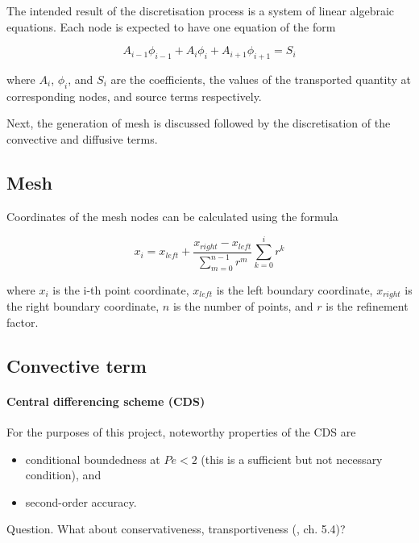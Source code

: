 \documentclass[12pt]{article}
\begin{document}
The intended result of the discretisation process is a system of linear algebraic equations. Each node is expected to have one equation of the form

\begin{equation}
    A_{i-1} \phi_{i-1} + A_{i} \phi_{i} + A_{i+1} \phi_{i+1} = S_{i}
\end{equation}

\noindent where $A_{i}$, $\phi_{i}$, and $S_{i}$ are the coefficients, the values of the transported quantity at corresponding nodes, and source terms respectively.

Next, the generation of mesh is discussed followed by the discretisation of the convective and diffusive terms.


\subsection{Mesh}
\label{sec:mesh}

Coordinates of the mesh nodes can be calculated using the formula

\begin{equation}
    x_i = x_{left} + \frac{x_{right} - x_{left}}{\sum_{m = 0}^{n - 1} r^m} \sum_{k = 0}^{i} r^k
\end{equation}

\noindent where $x_i$ is the i-th point coordinate, $x_{left}$ is the left boundary coordinate, $x_{right}$ is the right boundary coordinate, $n$ is the number of points, and $r$ is the refinement factor.


\subsection{Convective term}
\label{sec:convection}


\paragraph{Central differencing scheme (CDS)}

For the purposes of this project, noteworthy properties of the CDS are

\begin{itemize}
    \item conditional boundedness at $Pe < 2$ (this is a sufficient but not necessary condition), and
    \item second-order accuracy.
\end{itemize}

Question. What about conservativeness, transportiveness (\textcite{VerMalCFD}, ch. 5.4)?
\end{document}
